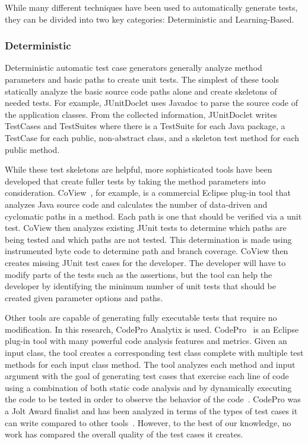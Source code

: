 While many different techniques have been used to automatically generate tests, they can be divided into two key categories: Deterministic and Learning-Based.

\subsubsection{Deterministic}
Deterministic automatic test case generators generally analyze method parameters and basic paths to create unit tests.  The simplest of these tools statically analyze the basic source code paths alone and create skeletons of  needed tests.  For example, JUnitDoclet \cite{JUnitDoclet} uses Javadoc to parse the source code of the application classes. From the collected information, JUnitDoclet writes TestCases and TestSuites where there is a TestSuite for each Java package, a TestCase for each public, non-abstract class, and a skeleton test method for each public method. %

While these test skeletons are helpful, more sophisticated tools have been developed that create fuller tests by taking the method parameters into consideration. CoView~\cite{CoView}, for example, is a commercial Eclipse plug-in tool that analyzes Java source code and calculates the number of data-driven and cyclomatic paths in a method. Each path is one that should be verified via a unit test. CoView then analyzes existing JUnit tests to determine which paths are being tested and which paths are not tested. This determination is made using instrumented byte code to determine path and branch coverage. CoView then creates missing JUnit test cases for the developer. The developer will have to modify parts of the tests such as the assertions, but the tool can help the developer by identifying the minimum number of unit tests that should be created given parameter options and paths.

Other tools are capable of generating fully executable tests that require no modification.  In this research, CodePro Analytix is used.  CodePro~\cite{CodePro1} is an Eclipse plug-in tool with many powerful code analysis features and metrics.  Given an input class, the tool creates a corresponding test class complete with multiple test methods for each input class method. The tool analyzes each method and input argument with the goal of generating test cases that exercise each line of code using a combination of both static code analysis and by dynamically executing the code to be tested in order to observe the behavior of the code~\cite{CodePro2}.  CodePro was a Jolt Award finalist and has been analyzed in terms of the types of test cases it can write compared to other tools~\cite{xie2009}.  However, to the best of our knowledge, no work has compared the overall quality of the test cases it creates.

